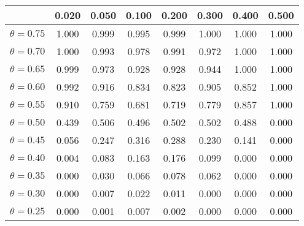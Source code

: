 \begin{table}[h!]
\begin{center}
\caption{}
\label{tab:proba}
\begin{tabular}{|c|c|c|c|c|c|c|c|} \hline
 &  0.020 &  0.050 &  0.100 &  0.200 &  0.300 &  0.400 &  0.500 \\ \hline
$\theta = 0.75$ & 
  1.000 &  0.999 &  0.995 &  0.999 &  1.000 &  1.000 &  1.000 \\ \hline
$\theta = 0.70$ & 
  1.000 &  0.993 &  0.978 &  0.991 &  0.972 &  1.000 &  1.000 \\ \hline
$\theta = 0.65$ & 
  0.999 &  0.973 &  0.928 &  0.928 &  0.944 &  1.000 &  1.000 \\ \hline
$\theta = 0.60$ & 
  0.992 &  0.916 &  0.834 &  0.823 &  0.905 &  0.852 &  1.000 \\ \hline
$\theta = 0.55$ & 
  0.910 &  0.759 &  0.681 &  0.719 &  0.779 &  0.857 &  1.000 \\ \hline
$\theta = 0.50$ & 
  0.439 &  0.506 &  0.496 &  0.502 &  0.502 &  0.488 &  0.000 \\ \hline
$\theta = 0.45$ & 
  0.056 &  0.247 &  0.316 &  0.288 &  0.230 &  0.141 &  0.000 \\ \hline
$\theta = 0.40$ & 
  0.004 &  0.083 &  0.163 &  0.176 &  0.099 &  0.000 &  0.000 \\ \hline
$\theta = 0.35$ & 
  0.000 &  0.030 &  0.066 &  0.078 &  0.062 &  0.000 &  0.000 \\ \hline
$\theta = 0.30$ & 
  0.000 &  0.007 &  0.022 &  0.011 &  0.000 &  0.000 &  0.000 \\ \hline
$\theta = 0.25$ & 
  0.000 &  0.001 &  0.007 &  0.002 &  0.000 &  0.000 &  0.000 \\ \hline
\end{tabular}
\end{center}
\end{table}

